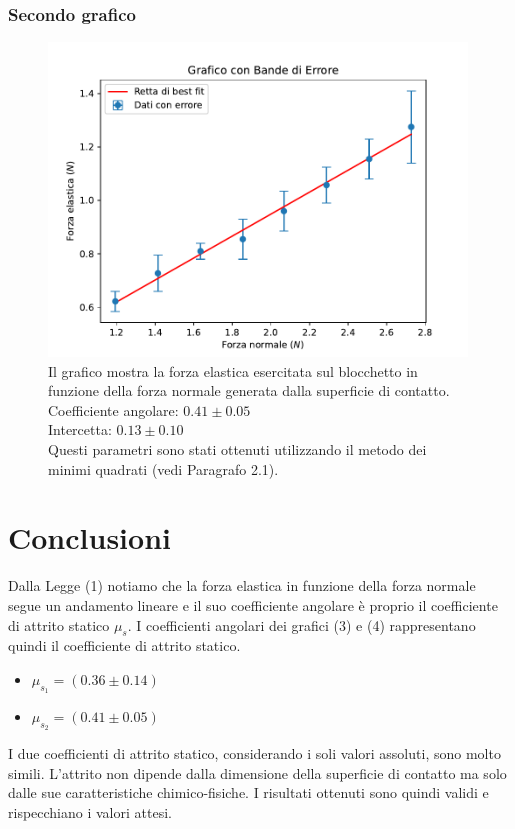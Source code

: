 \documentclass[11pt]{article}
\begin{document}
\subsubsection{Secondo grafico}
\begin{figure}[H]
  \centering
  \includegraphics[width=0.99\textwidth]{grafico2.pdf}
  \caption{Il grafico mostra la forza elastica esercitata sul blocchetto in funzione della forza normale generata dalla superficie di contatto. \\
  Coefficiente angolare: $0.41\pm 0.05$ \\
  Intercetta: $0.13\pm 0.10$ \\
  Questi parametri sono stati ottenuti utilizzando il metodo dei minimi quadrati (vedi Paragrafo 2.1).}
\end{figure}

\section{Conclusioni}
Dalla Legge (1) notiamo che la forza elastica in funzione della forza normale segue un andamento lineare e il suo coefficiente angolare è proprio il coefficiente di attrito statico $\mu_s$. I coefficienti angolari dei grafici (3) e (4) rappresentano quindi il coefficiente di attrito statico.
\begin{itemize}
    \item $\mu_{s_1} = (0.36\pm 0.14)$
    \item $\mu_{s_2} = (0.41\pm 0.05)$
\end{itemize}
I due coefficienti di attrito statico, considerando i soli valori assoluti, sono molto simili. L'attrito non dipende dalla dimensione della superficie di contatto ma solo dalle sue caratteristiche chimico-fisiche. I risultati ottenuti sono quindi validi e rispecchiano i valori attesi.
\end{document}
